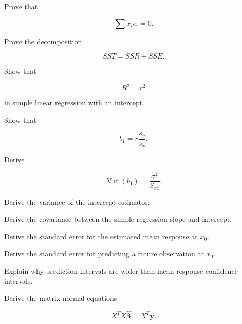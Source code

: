 \begin{exercise}[3]
Prove that

\[
\sum x_ie_i=0.
\]
\end{exercise}

\begin{exercise}[3]
Prove the decomposition

\[
SST
=
SSR
+
SSE.
\]
\end{exercise}

\begin{exercise}[3]
Show that

\[
R^2=r^2
\]

in simple linear regression with an intercept.
\end{exercise}

\begin{exercise}[3]
Show that

\[
b_1
=
r
\frac{s_y}{s_x}.
\]
\end{exercise}

\begin{exercise}[3]
Derive

\[
\operatorname{Var}(b_1)
=
\frac{
\sigma^2
}{
S_{xx}
}.
\]
\end{exercise}

\begin{exercise}[3]
Derive the variance of the intercept estimator.
\end{exercise}

\begin{exercise}[3]
Derive the covariance between the simple-regression slope and intercept.
\end{exercise}

\begin{exercise}[3]
Derive the standard error for the estimated mean response at \(x_0\).
\end{exercise}

\begin{exercise}[3]
Derive the standard error for predicting a future observation at \(x_0\).
\end{exercise}

\begin{exercise}[3]
Explain why prediction intervals are wider than mean-response confidence
intervals.
\end{exercise}

\begin{exercise}[3]
Derive the matrix normal equations

\[
X^TX\widehat{\boldsymbol{\beta}}
=
X^T\mathbf{y}.
\]
\end{exercise}

